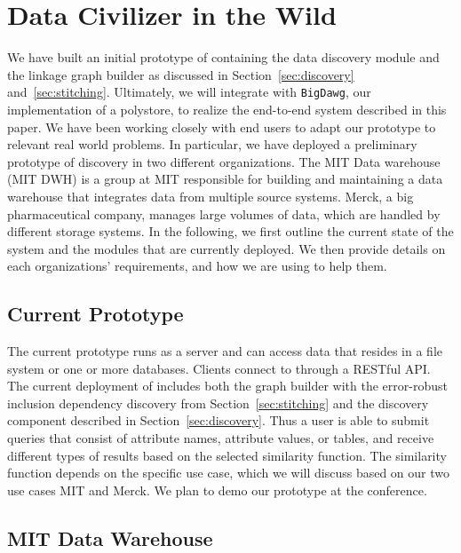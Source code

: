 \vspace{-.1em}
\section{Data Civilizer in the Wild}
\label{sec:wild}

We have built an initial prototype of \dcv containing the data discovery module
and the linkage graph builder as discussed in Section~\ref{sec:discovery}
and~\ref{sec:stitching}. Ultimately, we will integrate \dcv with
\texttt{BigDawg}, our implementation of a polystore, to realize the end-to-end
system described in this paper. We have been working closely with end users to
adapt our prototype to relevant real world problems. In particular, we have
deployed a preliminary prototype of discovery in two different organizations. The
MIT Data warehouse (MIT DWH) is a group at MIT responsible for building and
maintaining a data warehouse that integrates data from multiple source systems.
Merck, a big pharmaceutical company, manages large volumes of data, which are
handled by different storage systems.  In the following, we first outline the
current state of the system and the modules that are currently deployed.  We
then provide details on each organizations' requirements, and how we are using
\dcv to help them.

\subsection{Current \titledcv Prototype} 

The current prototype runs as a
server and can access data that resides in a file system or one or more
databases.  Clients  connect to \dcv through a RESTful API.  The current
deployment of \dcv  includes both  the graph builder with the error-robust
inclusion dependency discovery from Section~\ref{sec:stitching} and the
discovery component described in Section~\ref{sec:discovery}.  Thus a user is
able to submit queries that consist of attribute names, attribute values, or
tables, and receive different types of results based on the selected
similarity function. The similarity function depends on the specific use case,
which we will discuss based on our two use cases MIT and Merck.  We plan to
demo our \dcv prototype at the conference.

\subsection{MIT Data Warehouse}


